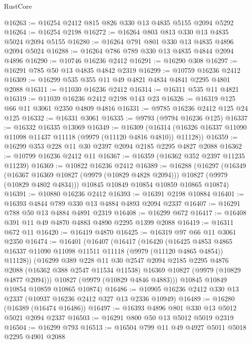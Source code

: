 \begin{lexlean}{RustCore}
\begin{coremodule}
@16263 := @16254 @2412 @815 @826 @330 @13 @4835 @5155 @2094 @5292
@16264 := @16254 @2198
@16272 := @16264 @803 @813 @330 @13 @4835 @5024 @2094 @5155
@16280 := @16264 @791 @801 @330 @13 @4835 @4896 @2094 @5024
@16288 := @16264 @786 @789 @330 @13 @4835 @4844 @2094 @4896
@16290 := @10746 @16236 @2412
@16291 := @16290 @308
@16297 := @16291 @785 @50 @13 @4835 @4842 @2319
@16299 := @10759 @16236 @2412
@16309 := @16299 @535 @355 @11 @49 @4821 @4834 @4841 @2295 @4801 @2088
@16311 := @11030 @16236 @2412
@16314 := @16311 @535 @11 @4821
@16319 := @11039 @16236 @2412 @2198 @143 @23
@16326 := @16319 @125 @66 @11 @3061 @2350 @4809 @4816
@16331 := @9785 @16236 @2412 @125 @24 @125
@16332 := @16331 @3061
@16335 := @9793 (@9794 @16236 @125)
@16337 := @16332 @16335 @13069
@16349 := @16309
    (@16314 (@16326 @16337 @11090 @11098 @11437 @11118 (@9979 (@11120 @4816 @4810)) @11128))
@16359 := @16299 @353 @228 @11 @30 @2397 @2094 @2185 @2295 @4827 @2088
@16362 := @10799 @16236 @2412 @11
@16367 := @16359 (@16362 @352 @2397 @11235 @11239)
@16369 := @10822 @16236 @2412
@16389 := @16288
    (@16297
      (@16349
        (@16367 @16369 @10827 (@9979 (@10829 @4828 @2094)))
        @10827
        (@9979 (@10829 @4802 @4834)))
      @10845
      @10849
      @10854
      @10859
      @10865
      @10874)
@16391 := @10880 @16236 @2412
@16393 := @16391 @2198 @10884
@16401 := @16393 @4844 @789 @330 @13 @4884 @4893 @2094 @2337
@16407 := @16291 @788 @50 @13 @4884 @4891 @2319
@16408 := @16299 @672
@16417 := @16408 @391 @11 @49 @4870 @4883 @4890 @2295 @1399 @2088
@16419 := @16311 @672 @11
@16420 := @16419 @4870
@16425 := @16319 @97 @66 @11 @3061 @2350
@16474 := @16401
    (@16407
      (@16417
        (@16420
          (@16425
            @4853
            @4865
            @16337
            @11090
            @11098
            @11511
            @11118
            (@9979 (@11120 @4865 @4854))
            @11128))
        (@16299
          @389
          @228
          @11
          @30
          @2547
          @2094
          @2185
          @2295
          @4876
          @2088
          (@16362 @388 @2547 @11534 @11538)
          @16369
          @10827
          (@9979 (@10829 @4877 @2094)))
        @10827
        (@9979 (@10829 @4846 @4883)))
      @10845
      @10849
      @10854
      @10859
      @10865
      @10874)
@16486 := @10905 @16236 @2412 @330 @13 @2337 (@10937 @16236 @2412 @327 @13 @2336 @10949)
@16489 := @16280 (@16389 (@16474 @16486))
@16497 := @16393 @4896 @801 @330 @13 @5012 @5021 @2094 @2337
@16503 := @16291 @800 @50 @13 @5012 @5019 @2319
@16504 := @16299 @793
@16513 := @16504 @799 @11 @49 @4927 @5011 @5018 @2295 @4901 @2088

\end{coremodule}
\end{lexlean}
